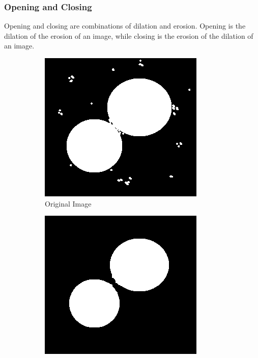 \subsubsection{Opening and Closing}
Opening and closing are combinations of dilation and erosion. Opening is the dilation of the erosion of an image, while closing is the erosion of the dilation of an image. 

\begin{figure}[ht]
    \centering
    \begin{subfigure}{0.33\textwidth}
        \centering
        \includegraphics[width=.99\linewidth]{images/literature/morphological/dots}
        \caption{Original Image}
    \end{subfigure}%
    \begin{subfigure}{.33\textwidth}
        \centering
        \includegraphics[width=.99\linewidth]{images/literature/morphological/opening}

\end{subfigure}
\end{figure}
